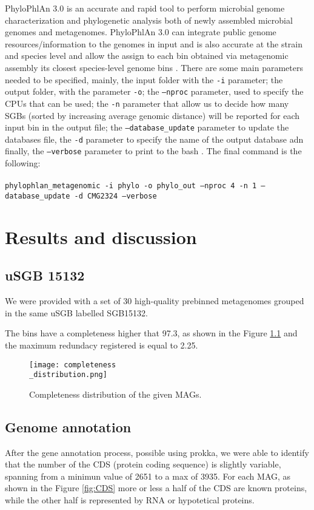 \documentclass[a4paper,titlepage]{book}
\newcommand{\code}[1]{\colorbox{light-gray}{\texttt{#1}}}
\begin{document}
PhyloPhlAn 3.0 is an accurate and rapid tool to perform microbial genome characterization and phylogenetic analysis both of newly assembled microbial genomes and metagenomes. PhyloPhlAn 3.0 can integrate public genome resources/information to the genomes in input and is also accurate at the strain and species level and allow the assign to each bin obtained via metagenomic assembly its closest species-level genome bins \cite{Phylo}.
There are some main parameters needed to be specified, mainly, the input folder with the \code{-i} parameter; the output folder, with the parameter \code{-o}; the \code{--nproc} parameter, used to specify the CPUs that can be used; the \code{-n} parameter that allow us to decide  how many SGBs (sorted by increasing average genomic distance) will be reported for each input bin in the output file; the \code{--database\_update} parameter to update the databases file, the \code{-d} parameter to specify the name of the output database adn finally, the \code{--verbose} parameter to print to the bash \cite{PhyloGuide}.
The final command is the following:\\ \newline \\ \code{phylophlan\_metagenomic -i phylo -o phylo\_out --nproc 4 -n 1 --database\_update -d CMG2324 --verbose}

\chapter{Results and discussion}

\section{uSGB 15132}

We were provided with a set of 30 high-quality prebinned metagenomes grouped in the same uSGB labelled SGB15132.

The bins have a completeness higher that 97.3, as shown in the Figure \ref{fig:compl} and the maximum redundacy registered is equal to 2.25.

\begin{figure}[ht]
\centering
\texttt{[image: completeness\\\_distribution.png]}
\caption{Completeness distribution of the given MAGs.}
\label{fig:compl}
\end{figure}

\section{Genome annotation}
After the gene annotation process, possible using prokka, we were able to identify that the number of the CDS (protein coding sequence) is slightly variable, spanning from a minimun value of 2651 to a max of 3935. For each MAG, as shown in the Figure \ref{fig:CDS} more or less a half of the CDS are known proteins, while the other half is represented by RNA or hypotetical proteins.
\end{document}
